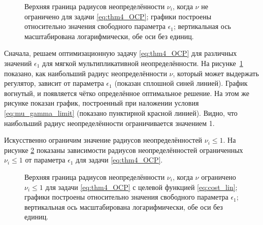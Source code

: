 \begin{figure}[ht]
	\caption{Верхняя граница радиусов неопределённости $\nu_i$, когда $\nu$ не ограничено для задачи \eqref{eq:thm4_OCP}; графики построены относительно значения свободного параметра $\epsilon_1$; вертикальная ось масштабирована логарифмически, обе оси без единиц.}\label{fig:mult_soft_nu}
\end{figure} 
Сначала, решаем оптимизационную задачу \eqref{eq:thm4_OCP} для различных значений $\epsilon_1$ для мягкой мультипликативной неопределённости. 
На рисунке~\ref{fig:mult_soft_nu} показано, как наибольший радиус неопределённости $\nu$, который может выдержать регулятор, зависит от параметра $\epsilon_1$ (показан сплошной синей линией). График вогнутый, и появляется чётко определённое оптимальное решение. На этом же рисунке показан график, построенный при наложении условия \eqref{eq:mu_gamma_limit} (показано пунктирной красной линией). Видно, что наибольший радиус неопределённости ограничивается значением 1.

Искусственно ограничим значение радиусов неопределённостей $\nu_i \leq 1$. На рисунке \ref{fig:mult_soft_less_than_unit} показаны зависимости радиусов неопределённостей ограниченных $\nu_i \leq 1$ от параметра $\epsilon_1$ для задачи \eqref{eq:thm4_OCP}.
\begin{figure}[ht]
	\caption{Верхняя граница радиусов неопределённости $\nu_i$, когда $\nu$ ограничено $\nu_i \leq 1$ для задачи \eqref{eq:thm4_OCP} с целевой функцией \eqref{eq:cost_lin}; графики построены относительно значения свободного параметра $\epsilon_1$; вертикальная ось масштабирована логарифмически, обе оси без единиц.}\label{fig:mult_soft_less_than_unit}
\end{figure}

